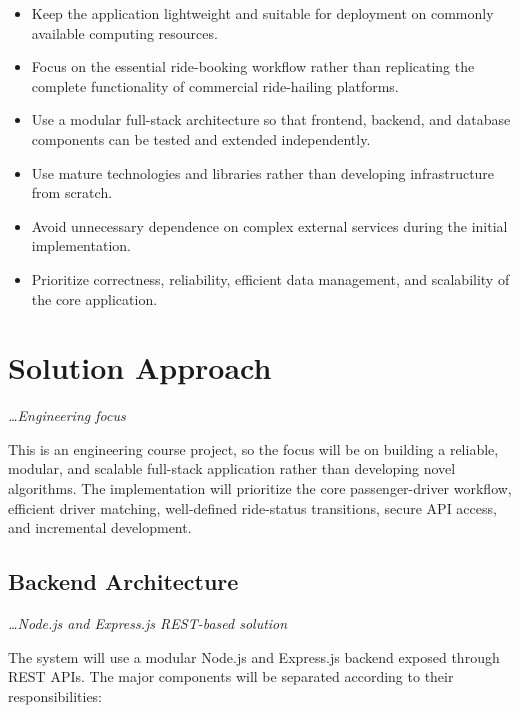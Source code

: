 \documentclass[11pt,a4paper]{article}
\newcommand{\BvrHint}[1]{%
  {\normalfont\normalsize\itshape\hfill #1}}
\begin{document}
\begin{itemize}

    \item Keep the application lightweight and suitable for
    deployment on commonly available computing resources.

    \item Focus on the essential ride-booking workflow rather than
    replicating the complete functionality of commercial
    ride-hailing platforms.

    \item Use a modular full-stack architecture so that frontend,
    backend, and database components can be tested and extended
    independently.

    \item Use mature technologies and libraries rather than
    developing infrastructure from scratch.

    \item Avoid unnecessary dependence on complex external services
    during the initial implementation.

    \item Prioritize correctness, reliability, efficient data
    management, and scalability of the core application.

\end{itemize}


\section{Solution Approach}
\BvrHint{\ldots Engineering focus}

This is an engineering course project, so the focus will be on
building a reliable, modular, and scalable full-stack application
rather than developing novel algorithms. The implementation will
prioritize the core passenger-driver workflow, efficient driver
matching, well-defined ride-status transitions, secure API access,
and incremental development.


\subsection{Backend Architecture}
\BvrHint{\ldots Node.js and Express.js REST-based solution}

The system will use a modular Node.js and Express.js backend exposed
through REST APIs. The major components will be separated according
to their responsibilities:
\end{document}
